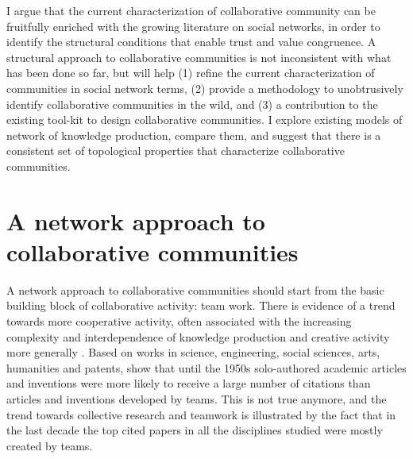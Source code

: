 I argue that the current characterization of collaborative community can be fruitfully enriched with the growing literature on social networks, in order to identify the structural conditions that enable trust and value congruence. A structural approach to collaborative communities is not inconsistent with what has been done so far, but will help (1) refine the current characterization of communities in social network terms, (2) provide a methodology to unobtrusively identify collaborative communities in the wild, and (3) a contribution to the existing tool-kit to design collaborative communities. I explore existing models of network of knowledge production, compare them, and suggest that there is a consistent set of topological properties that characterize collaborative communities.

\section{A network approach to collaborative communities}

A network approach to collaborative communities should start from the basic building block of collaborative activity: team work. There is evidence of a trend towards more cooperative activity, often associated with the increasing complexity and interdependence of knowledge production and creative activity more generally \citep*{guimera:2005,uzzi:2005,uzzi:2007a,jones:2008}. Based on works in science, engineering, social sciences, arts, humanities and patents, \citet{uzzi:2007a} show that until the 1950s solo-authored academic articles and inventions were more likely to receive a large number of citations than articles and inventions developed by teams.  This is not true anymore, and the trend towards collective research and teamwork is illustrated by the fact that in the last decade the top cited papers in all the disciplines studied were mostly created by teams.

